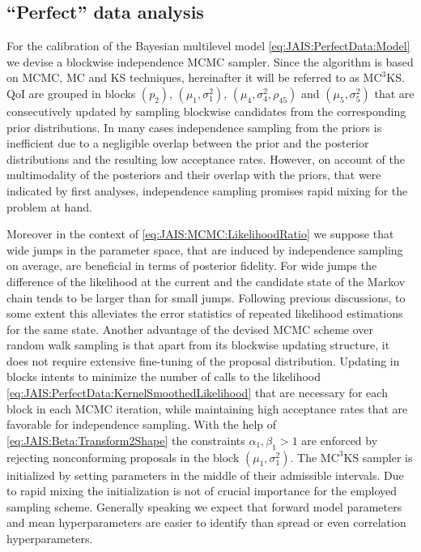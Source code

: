 \subsection{``Perfect'' data analysis}
For the calibration of the  Bayesian multilevel model \cref{eq:JAIS:PerfectData:Model} we devise a blockwise independence MCMC sampler.
Since the algorithm is based on MCMC, MC and KS techniques, hereinafter it will be referred to as \(\text{MC}^3\text{KS}\).
QoI are grouped in blocks \((p_2)\), \((\mu_1,\sigma^2_1)\), \((\mu_4,\sigma^2_4,\rho_{45})\) and \((\mu_5,\sigma^2_5)\)
that are consecutively updated by sampling blockwise candidates from the corresponding prior distributions.
In many cases independence sampling from the priors is inefficient due to a negligible overlap between the prior and the posterior distributions and the resulting low acceptance rates.
However, on account of the multimodality of the posteriors and their overlap with the priors, that were indicated by first analyses, independence sampling promises rapid mixing for the problem at hand.
\par %
Moreover in the context of \cref{eq:JAIS:MCMC:LikelihoodRatio} we suppose that wide jumps in the parameter space, that are induced by independence sampling on average, are beneficial in terms of posterior fidelity.
For wide jumps the difference of the likelihood at the current and the candidate state of the Markov chain tends to be larger than for small jumps.
Following previous discussions, to some extent this alleviates the error statistics of repeated likelihood estimations for the same state.
Another advantage of the devised MCMC scheme over random walk sampling is that apart from its blockwise updating structure, it does not require extensive fine-tuning of the proposal distribution.
Updating in blocks intents to minimize the number of calls to the likelihood \cref{eq:JAIS:PerfectData:KernelSmoothedLikelihood}
that are necessary for each block in each MCMC iteration, while maintaining high acceptance rates that are favorable for independence sampling.
With the help of \cref{eq:JAIS:Beta:Transform2Shape} the constraints \(\alpha_1,\beta_1>1\) are enforced by rejecting nonconforming proposals in the block \((\mu_1,\sigma^2_1)\).
The \(\text{MC}^3\text{KS}\) sampler is initialized by setting parameters in the middle of their admissible intervals.
Due to rapid mixing the initialization is not of crucial importance for the employed sampling scheme.
Generally speaking we expect that forward model parameters and mean hyperparameters are easier to identify than spread or even correlation hyperparameters.

